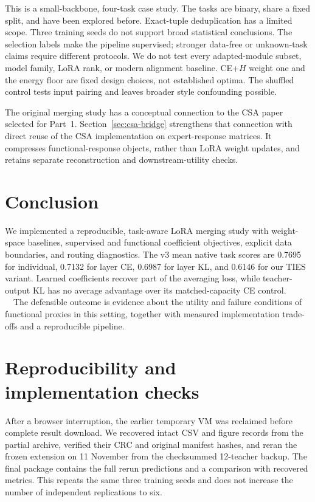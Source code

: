 \documentclass[11pt,a4paper]{article}
\begin{document}
This is a small-backbone, four-task case study. The tasks are binary, share a fixed split, and have been explored before. Exact-tuple deduplication has a limited scope. Three training seeds do not support broad statistical conclusions. The selection labels make the pipeline supervised; stronger data-free or unknown-task claims require different protocols. We do not test every adapted-module subset, model family, LoRA rank, or modern alignment baseline. CE+$H$ weight one and the energy floor are fixed design choices, not established optima. The shuffled control tests input pairing and leaves broader style confounding possible.

The original merging study has a conceptual connection to the CSA paper selected for Part~1. Section~\ref{sec:csa-bridge} strengthens that connection with direct reuse of the CSA implementation on expert-response matrices. It compresses functional-response objects, rather than LoRA weight updates, and retains separate reconstruction and downstream-utility checks.



\section{Conclusion}
We implemented a reproducible, task-aware LoRA merging study with weight-space baselines, supervised and functional coefficient objectives, explicit data boundaries, and routing diagnostics. The v3 mean native task scores are 0.7695 for individual, 0.7132 for layer CE, 0.6987 for layer KL, and 0.6146 for our TIES variant. Learned coefficients recover part of the averaging loss, while teacher-output KL has no average advantage over its matched-capacity CE control. \ConclusionExtension\ \ConclusionVtwo\ The defensible outcome is evidence about the utility and failure conditions of functional proxies in this setting, together with measured implementation trade-offs and a reproducible pipeline.

\appendix
\section{Reproducibility and implementation checks}
After a browser interruption, the earlier temporary VM was reclaimed before complete result download. We recovered intact CSV and figure records from the partial archive, verified their CRC and original manifest hashes, and reran the frozen extension on 11 November from the checksummed 12-teacher backup. The final package contains the full rerun predictions and a comparison with recovered metrics. This repeats the same three training seeds and does not increase the number of independent replications to six.
\end{document}
